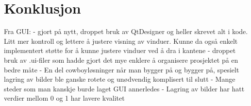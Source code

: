 \section{Konklusjon}


Fra GUI: 
- gjort på nytt, droppet bruk av QtDesigner og heller skrevet alt i kode. Litt mer kontroll og lettere å justere visning av vinduer. Kunne da også enkelt implementert støtte for å kunne justere vinduer ved å dra i kantene
- droppet bruk av .ui-filer som hadde gjort det mye enklere å organisere prosjektet på en bedre måte
- En del cowboyløsninger når man bygger på og bygger på, spesielt lagring av bilder ble ganske rotete og unødvendig komplisert til slutt
- Mange steder som man kanskje burde laget GUI annerledes
- Lagring av bilder har hatt verdier mellom 0 og 1 har lavere kvalitet